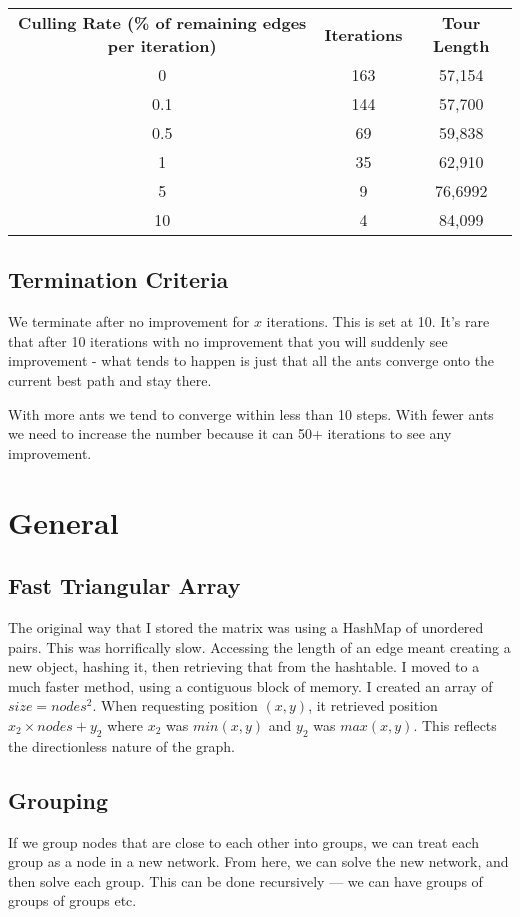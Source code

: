 \documentclass[a4paper, 11pt,table]{article}
\begin{document}
\begin{center}
	\begin{tabu}{|c c c|}
		\textbf{Culling Rate (\% of remaining edges per iteration)} & \textbf{Iterations} & \textbf{Tour Length}\\
		0 & 163 & 57,154\\
		0.1 & 144 & 57,700\\
		0.5 & 69 & 59,838 \\
		1 & 35 & 62,910\\
		5 & 9 & 76,6992\\
		10 & 4 & 84,099\\
	\end{tabu}
\end{center}

\subsection{Termination Criteria}
We terminate after no improvement for $x$ iterations. This is set at 10. It's rare that after 10 iterations with no improvement that you will suddenly see improvement - what tends to happen is just that all the ants converge onto the current best path and stay there.

With more ants we tend to converge within less than 10 steps. With fewer ants we need to increase the number because it can 50+ iterations to see any improvement.

\section{General}
\subsection{Fast Triangular Array}
The original way that I stored the matrix was using a HashMap of unordered pairs. This was horrifically slow. Accessing the length of an edge meant creating a new object, hashing it, then retrieving that from the hashtable. I moved to a much faster method, using a contiguous block of memory. I created an array of $size=nodes^2$. When requesting position $(x,y)$, it retrieved position $x_2 \times nodes + y_2$ where $x_2$ was $min(x,y)$ and $y_2$ was $max(x,y)$. This reflects the directionless nature of the graph.

\subsection{Grouping}
If we group nodes that are close to each other into groups, we can treat each group as a node in a new network. From here, we can solve the new network, and then solve each group. This can be done recursively --- we can have groups of groups of groups etc.
\end{document}
